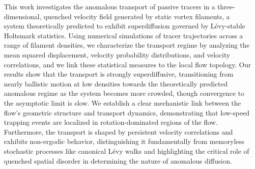 \documentclass[]{article}
\begin{document}
This work investigates the anomalous transport of passive tracers in a three-dimensional, quenched velocity field generated by static vortex filaments, a system theoretically predicted to exhibit superdiffusion governed by Lévy-stable Holtsmark statistics. Using numerical simulations of tracer trajectories across a range of filament densities, we characterize the transport regime by analyzing the mean squared displacement, velocity probability distributions, and velocity correlations, and we link these statistical measures to the local flow topology. Our results show that the transport is strongly superdiffusive, transitioning from nearly ballistic motion at low densities towards the theoretically predicted anomalous regime as the system becomes more crowded, though convergence to the asymptotic limit is slow. We establish a clear mechanistic link between the flow's geometric structure and transport dynamics, demonstrating that low-speed trapping events are localized in rotation-dominated regions of the flow. Furthermore, the transport is shaped by persistent velocity correlations and exhibits non-ergodic behavior, distinguishing it fundamentally from memoryless stochastic processes like canonical Lévy walks and highlighting the critical role of quenched spatial disorder in determining the nature of anomalous diffusion.
\end{document}
